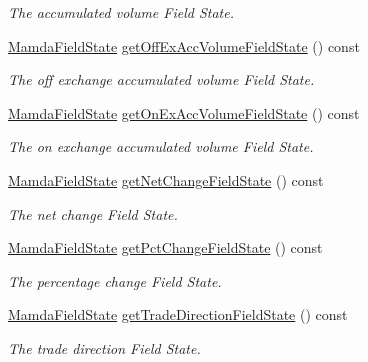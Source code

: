 \begin{CompactItemize}
\begin{CompactList}\small\item\em The accumulated volume Field State. \item\end{CompactList}\item 
\hyperlink{namespaceWombat_93aac974f2ab713554fd12a1fa3b7d2a}{Mamda\-Field\-State} \hyperlink{classWombat_1_1MamdaTradeListener_ebdb316690769ff380d8e1950a878de3}{get\-Off\-Ex\-Acc\-Volume\-Field\-State} () const 
\begin{CompactList}\small\item\em The off exchange accumulated volume Field State. \item\end{CompactList}\item 
\hyperlink{namespaceWombat_93aac974f2ab713554fd12a1fa3b7d2a}{Mamda\-Field\-State} \hyperlink{classWombat_1_1MamdaTradeListener_ce848079dc4e2282b59ca502f891e436}{get\-On\-Ex\-Acc\-Volume\-Field\-State} () const 
\begin{CompactList}\small\item\em The on exchange accumulated volume Field State. \item\end{CompactList}\item 
\hyperlink{namespaceWombat_93aac974f2ab713554fd12a1fa3b7d2a}{Mamda\-Field\-State} \hyperlink{classWombat_1_1MamdaTradeListener_b147b82694481c48a976dce74b2b0241}{get\-Net\-Change\-Field\-State} () const 
\begin{CompactList}\small\item\em The net change Field State. \item\end{CompactList}\item 
\hyperlink{namespaceWombat_93aac974f2ab713554fd12a1fa3b7d2a}{Mamda\-Field\-State} \hyperlink{classWombat_1_1MamdaTradeListener_43832d2f10f4757e6ed29c82f875c976}{get\-Pct\-Change\-Field\-State} () const 
\begin{CompactList}\small\item\em The percentage change Field State. \item\end{CompactList}\item 
\hyperlink{namespaceWombat_93aac974f2ab713554fd12a1fa3b7d2a}{Mamda\-Field\-State} \hyperlink{classWombat_1_1MamdaTradeListener_0662220b81bda7b4fe9532ff4c15f3c8}{get\-Trade\-Direction\-Field\-State} () const 
\begin{CompactList}\small\item\em The trade direction Field State. \item\end{CompactList}\item 

\end{CompactItemize}
